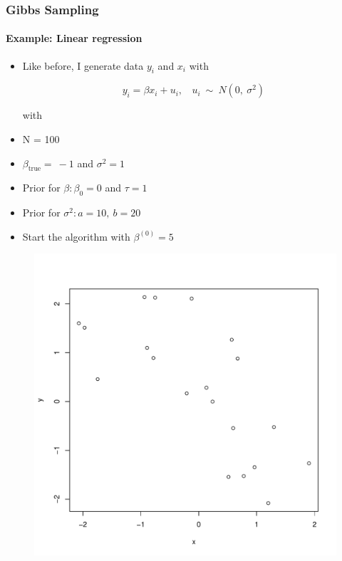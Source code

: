 \documentclass[
  shownotes,
  xcolor={svgnames},
  hyperref={colorlinks,citecolor=DarkBlue,linkcolor=DarkRed,urlcolor=DarkBlue}
  , aspectratio=169]{beamer}
\begin{document}
\begin{frame}[fragile]
\frametitle{Gibbs Sampling} 
\framesubtitle{Example: Linear regression}

\begin{itemize}
\item Like before, I generate data $y_{i}$ and $x_{i}$ with


$$y_{i} = \beta x_{i} + u_{i},\ \ \ \ u_{i}\ \sim\ N(0,\ \sigma^{2})$$

\footnotesize
with
\item N = 100

\item $\beta_{\text{true}} = \  - 1$ and $\sigma^{2} = 1$

\item Prior for $\beta:\beta_{0} = 0$ and $\tau = 1$

\item Prior for $\sigma^{2}:a = 10,\ b = 20$
\item Start the algorithm with $\beta^{(0)} = 5$
\end{itemize} 


\begin{figure}[H] \centering
  \centering
  \includegraphics[scale=0.2]{figures/scatter}
  \\
  \tiny 
\end{figure}

   \end{frame}
\end{document}
